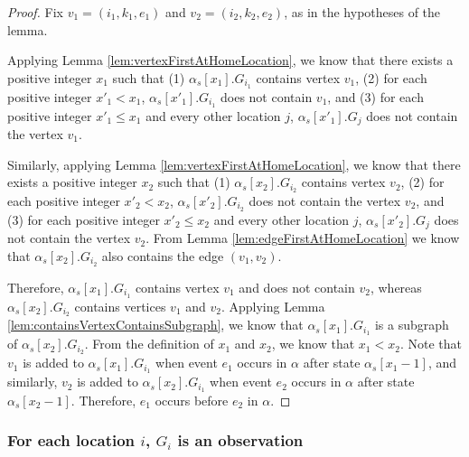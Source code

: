 \documentclass[11pt]{article}
\numberwithin{theorem}{section}
\begin{document}
\begin{proof}
Fix $v_1= (i_1,k_1,e_1)$ and $v_2 = (i_2,k_2,e_2)$, as in the hypotheses of the lemma.

Applying Lemma \ref{lem:vertexFirstAtHomeLocation}, we know that there
exists a positive integer $x_1$ such that (1) $\alpha_s[x_1].G_{i_1}$
contains vertex $v_1$, (2) for each positive integer $x'_1 < x_1$,
$\alpha_s[x'_1].G_{i_1}$ does not contain $v_1$, and (3) for each
positive integer $x'_1 \leq x_1$ and every other location $j$,
$\alpha_s[x'_1].G_{j}$ does not contain the vertex $v_1$.

Similarly, applying Lemma \ref{lem:vertexFirstAtHomeLocation}, we know
that there exists a positive integer $x_2$ such that (1)
$\alpha_s[x_2].G_{i_2}$ contains vertex $v_2$, (2) for each positive
integer $x'_2 < x_2$, $\alpha_s[x'_2].G_{i_2}$ does not contain the
vertex $v_2$, and (3) for each positive integer $x'_2 \leq x_2$ and
every other location $j$, $\alpha_s[x'_2].G_{j}$ does not contain the
vertex $v_2$. From Lemma \ref{lem:edgeFirstAtHomeLocation} we know
that $\alpha_s[x_2].G_{i_2}$ also contains the edge $(v_1,v_2)$.

Therefore, $\alpha_s[x_1].G_{i_1}$ contains vertex $v_1$ and does not
contain $v_2$, whereas $\alpha_s[x_2].G_{i_2}$ contains vertices $v_1$
and $v_2$. Applying Lemma \ref{lem:containsVertexContainsSubgraph}, we
know that  $\alpha_s[x_1].G_{i_1}$ is a subgraph of
$\alpha_s[x_2].G_{i_2}$. From the definition of $x_1$ and $x_2$, we
know that $x_1 < x_2$. Note that $v_1$ is added to
$\alpha_s[x_1].G_{i_1}$ when event $e_1$ occurs in $\alpha$ after
state $\alpha_s[x_1-1]$, and similarly, $v_2$ is added to
$\alpha_s[x_2].G_{i_1}$ when event $e_2$ occurs in $\alpha$ after
state $\alpha_s[x_2-1]$. Therefore, $e_1$ occurs before $e_2$ in
$\alpha$.
\end{proof}










\subsubsection{For each location $i$, $G_i$ is an observation}
\label{subsubsec:proofGisAreObs}
\end{document}
